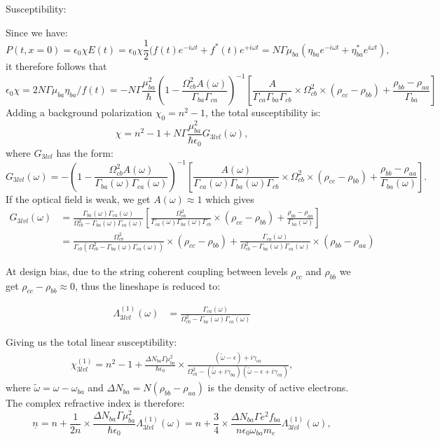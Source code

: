 \documentclass[10pt,letterpaper]{article}
\def\uline{\underline}
\begin{document}
	Susceptibility:
	
	Since we have:
	$$
	P(t,x=0) = \epsilon_0\chi E(t) = \epsilon_0 \chi \frac{1}{2} ( f(t)e^{-i\omega t} +f^*(t)e^{+i\omega t}= N\Gamma\mu_{ba}(\eta_{ba}e^{-i\omega t}+\eta_{ba}^*e^{i\omega t}),
	$$
	it therefore follows that 
	$$
	\epsilon_0 \chi = 2N\Gamma\mu_{ba}\eta_{ba}/f(t) = -N\Gamma\frac{\mu_{ba}^2}{\hbar}(1-\frac{\Omega_{cb}^2  A(\omega)}{\Gamma_{ba}\Gamma_{ca}})^{-1} \left [ \frac{A}{\Gamma_{ca}\Gamma_{ba}\Gamma_{cb}}\times \Omega_{cb}^2\times(\rho_{cc}-\rho_{bb}) +\frac{\rho_{bb}-\rho_{aa}}{\Gamma_{ba}} \right]
	$$
	Adding a background polarization $\chi_0 = n^2-1$, the total susceptibility is:
	$$
	\chi = n^2-1+N\Gamma\frac{\mu_{ba}^2}{\hbar\epsilon_0}G_{3lvl}(\omega),
	$$
	where $G_{3lvl}$ has the form:
	$$
	G_{3lvl}(\omega) = -
	(1-\frac{\Omega_{cb}^2  A(\omega)}{\Gamma_{ba}(\omega)\Gamma_{ca}(\omega)})^{-1} \left [ \frac{A(\omega)}{\Gamma_{ca}(\omega)\Gamma_{ba}(\omega)\Gamma_{cb}}\times \Omega_{cb}^2\times(\rho_{cc}-\rho_{bb}) +\frac{\rho_{bb}-\rho_{aa}}{\Gamma_{ba}(\omega)} \right].
	$$
	If the optical field is weak, we get $A(\omega) \approx 1$ which gives 
	\begin{align}
	G_{3lvl}(\omega)&= 
	\frac{\Gamma_{ba}(\omega)\Gamma_{ca}(\omega) }{\Omega_{cb}^2-\Gamma_{ba}(\omega)\Gamma_{ca}(\omega)} \left [ \frac{\Omega_{cb}^2}{\Gamma_{ca}(\omega)\Gamma_{ba}(\omega)\Gamma_{cb}}\times(\rho_{cc}-\rho_{bb}) +\frac{\rho_{bb}-\rho_{aa}}{\Gamma_{ba}(\omega)} \right] \\
	&=  \frac{\Omega_{cb}^2}{\Gamma_{cb}(\Omega_{cb}^2-\Gamma_{ba}(\omega)\Gamma_{ca}(\omega))}\times(\rho_{cc}-\rho_{bb}) +\frac{\Gamma_{ca}(\omega)}{\Omega_{cb}^2-\Gamma_{ba}(\omega)\Gamma_{ca}(\omega)}\times(\rho_{bb}-\rho_{aa}) 
	\end{align}
	
	At design bias, due to the string coherent coupling between levels $\rho_{cc}$ and $\rho_{bb}$ we get $\rho_{cc} - \rho_{bb}\approx {0}$, thus the lineshape is reduced to:
	
	\begin{align}
	\Lambda_{3lvl}^{(1)}(\omega) &= 
	\frac{\Gamma_{ca}(\omega)}{\Omega_{cb}^2-\Gamma_{ba}(\omega)\Gamma_{ca}(\omega)} 
	\end{align}
	
	Giving us the total linear susceptibility:
	\begin{align}
	\chi_{3lvl}^{(1)} = n^2-1+\frac{\Delta N_{ba}\Gamma\mu_{ba}^2}{\hbar\epsilon_0}\times\frac{(\tilde{\omega}-\epsilon)+i\gamma_{ca}}{\Omega_{cb}^2-(\tilde{\omega}+i\gamma_{ba})(\tilde{\omega}-\epsilon+i\gamma_{ca})}, 
	\end{align}
	where $\tilde{\omega} = \omega - \omega_{ba}$ and $\Delta N_{ba} = N(\rho_{bb}-\rho_{aa})$ is the density of active electrons.  The complex refractive index is therefore:
	$$
	\uline{n} = n+\frac{1}{2n}\times \frac{\Delta N_{ba}\Gamma \mu_{ba}^2}{\hbar \epsilon_0} \Lambda_{3lvl}^{(1)}({\omega}) = n+\frac{3}{4}\times \frac{\Delta N_{ba}\Gamma e^2f_{ba}}{n\epsilon_0\omega_{ba}m_e} \Lambda_{3lvl}^{(1)}({\omega}),
	$$ 
	
\end{document}
